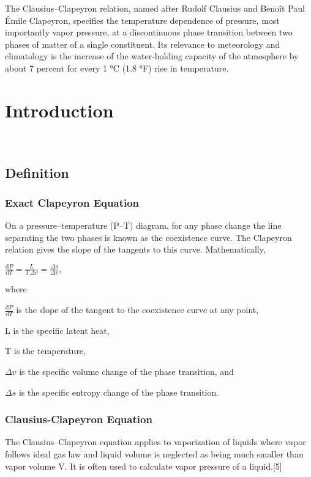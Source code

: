 \documentclass[12pt]{report}
\renewcommand{\>}{\ensuremath >\xspace}
\newcommand{\<}{\ensuremath <\xspace}
\begin{document}
\emph{}

The Clausius–Clapeyron relation, named after Rudolf Clausius and Benoît Paul Émile Clapeyron, specifies the temperature dependence of pressure, most importantly vapor pressure, at a discontinuous phase transition between two phases of matter of a single constituent. Its relevance to meteorology and climatology is the increase of the water-holding capacity of the atmosphere by about 7 percent for every 1 °C (1.8 °F) rise in temperature.
\singlespacing
{}
\tableofcontents{}
\normalsize
\newpage
{}
\doublespacing
\setlength{\parindent}{1.5em}
\chapter{Introduction}\
\section {Definition}
\subsection{Exact Clapeyron Equation}
On a pressure–temperature (P–T) diagram, for any phase change the line separating the two phases is known as the coexistence curve. The Clapeyron relation gives the slope of the tangents to this curve. Mathematically,

${\displaystyle {\frac {\mathrm {d} P}{\mathrm {d} T}}={\frac {L}{T\,\Delta v}}={\frac {\Delta s}{\Delta v}},}
$

where 

${\displaystyle {\frac {\mathrm {d} P}{\mathrm {d} T}}}
$
 is the slope of the tangent to the coexistence curve at any point, 

L is the specific latent heat, 

T is the temperature, 

${\Delta v}$ is the specific volume change of the phase transition, and 

${\Delta s}$ is the specific entropy change of the phase transition.
\newpage
\subsection{Clausius-Clapeyron Equation}
The Clausius–Clapeyron equation applies to vaporization of liquids where vapor follows ideal gas law and liquid volume is neglected as being much smaller than vapor volume V. It is often used to calculate vapor pressure of a liquid.[5]
\end{document}
